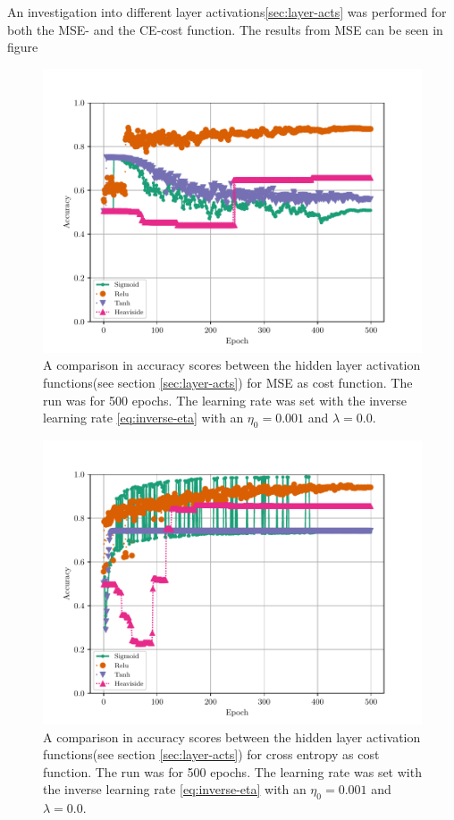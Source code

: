 An investigation into different layer activations\ref{sec:layer-acts} was performed for both the MSE- and the CE-cost function. The results from MSE can be seen in figure 
\begin{figure}[H]
    \centering
    \includegraphics[scale=1.0]{../fig/mlp_epoch_activations_mse.pdf}
    \caption{A comparison in accuracy scores between the hidden layer activation functions(see section \ref{sec:layer-acts}) for MSE as cost function. The run was for 500 epochs. The learning rate was set with the inverse learning rate \eqref{eq:inverse-eta} with an $\eta_0=0.001$ and $\lambda=0.0$.}
    \label{fig:mlp-epoch-activations-mse}
\end{figure}
\begin{figure}[H]
    \centering
    \includegraphics[scale=1.0]{../fig/mlp_epoch_activations_log_loss.pdf}
    \caption{A comparison in accuracy scores between the hidden layer activation functions(see section \ref{sec:layer-acts}) for cross entropy as cost function. The run was for 500 epochs. The learning rate was set with the inverse learning rate \eqref{eq:inverse-eta} with an $\eta_0=0.001$ and $\lambda=0.0$.}
    \label{fig:mlp-epoch-activations-log-loss}
\end{figure}

